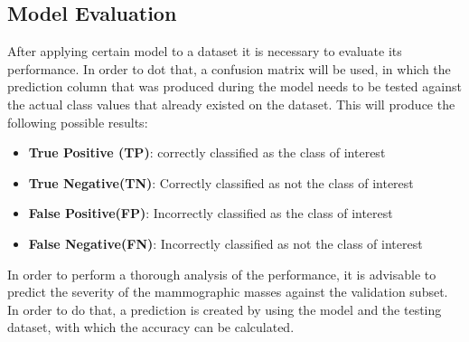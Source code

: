 \documentclass[a4paper,12pt]{article}\usepackage[]{graphicx}\usepackage[]{color}
\begin{document}
\subsection{Model Evaluation}\label{evaluation}
After applying certain model to a dataset it is necessary to evaluate its performance. In order to dot that, a confusion matrix will be used, in which the prediction column that was produced during the model needs to be tested against the actual class values that already existed on the dataset. This will produce the following possible results:
\begin{itemize}
  \item \textbf{True Positive (TP)}: correctly classified as the class of interest
  \item \textbf{True Negative(TN)}: Correctly classified as not the class of interest
  \item \textbf{False Positive(FP)}: Incorrectly classified as the class of interest
  \item \textbf{False Negative(FN)}: Incorrectly classified as not the class of interest
\end{itemize}

In order to perform a thorough analysis of the performance, it is advisable to predict the severity of the mammographic masses against the validation subset. In order to do that, a prediction is created by using the model and the testing dataset, with which the accuracy can be calculated.
\end{document}
